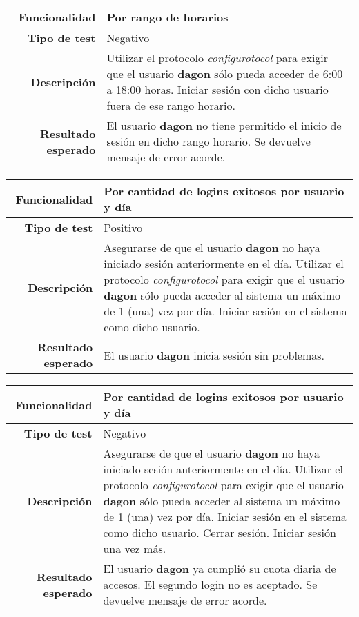 \documentclass[a4paper,10pt]{article}
\begin{document}
\begin{center}
  \begin{tabular}{|r|p{12.5cm}|}
    \hline
    \textbf{Funcionalidad}	&	Por rango de horarios\\
    \hline
    \textbf{Tipo de test}	&	Negativo\\
    \hline
    \textbf{Descripción}	&	Utilizar el protocolo \textit{configurotocol} para exigir que el usuario
					\textbf{dagon} sólo pueda acceder de 6:00 a 18:00 horas. Iniciar sesión con
					dicho usuario fuera de ese rango horario.\\
    \hline
    \textbf{Resultado esperado}	&	El usuario \textbf{dagon} no tiene permitido el inicio de sesión en dicho
					rango horario. Se devuelve mensaje de error acorde.\\
    \hline   
  \end{tabular}
\end{center}

\begin{center}
  \begin{tabular}{|r|p{12.5cm}|}
    \hline
    \textbf{Funcionalidad}	&	Por cantidad de logins exitosos por usuario y día\\
    \hline
    \textbf{Tipo de test}	&	Positivo\\
    \hline
    \textbf{Descripción}	&	Asegurarse de que el usuario \textbf{dagon} no haya iniciado sesión
					anteriormente en el día.
					Utilizar el protocolo \textit{configurotocol} para exigir que el usuario
					\textbf{dagon} sólo pueda acceder al sistema un máximo de 1 (una) vez
					por día. Iniciar sesión en el sistema como dicho usuario.\\
    \hline
    \textbf{Resultado esperado}	&	El usuario \textbf{dagon} inicia sesión sin problemas.\\
    \hline   
  \end{tabular}
\end{center}

\begin{center}
  \begin{tabular}{|r|p{12.5cm}|}
    \hline
    \textbf{Funcionalidad}	&	Por cantidad de logins exitosos por usuario y día\\
    \hline
    \textbf{Tipo de test}	&	Negativo\\
    \hline
    \textbf{Descripción}	&	Asegurarse de que el usuario \textbf{dagon} no haya iniciado sesión
					anteriormente en el día.
					Utilizar el protocolo \textit{configurotocol} para exigir que el usuario
					\textbf{dagon} sólo pueda acceder al sistema un máximo de 1 (una) vez
					por día. Iniciar sesión en el sistema como dicho usuario. Cerrar sesión.
					Iniciar sesión una vez más.\\
    \hline
    \textbf{Resultado esperado}	&	El usuario \textbf{dagon} ya cumplió su cuota diaria de accesos.
					El segundo login no es aceptado. Se devuelve mensaje de error acorde.\\
    \hline   
  \end{tabular}
\end{center}
\end{document}
